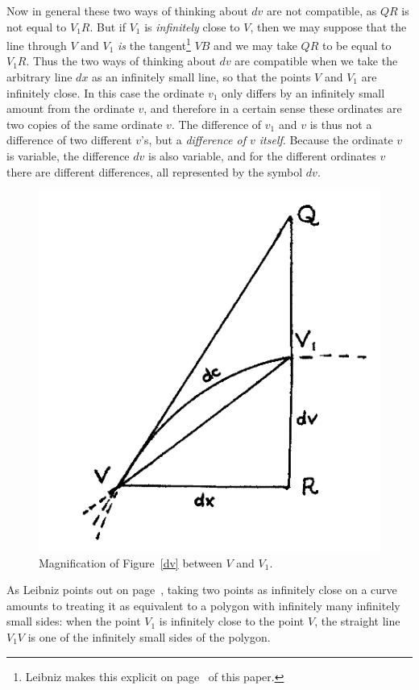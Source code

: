 \documentclass[twoside,openright]{article}
\begin{document}
Now in general these two ways of thinking about $dv$ are not
compatible, as $QR$ is not equal to $V_1R$.  But if $V_1$ is {\em
  infinitely} close to $V$, then we may suppose that the line through
$V$ and $V_1$ {\em is} the tangent\footnote{Leibniz makes this
  explicit on page~\pageref{taninfcl} of this paper.} $VB$ and we may
take $QR$ to be equal to $V_1R$.  Thus the two ways of thinking about
$dv$ are compatible when we take the arbitrary line $dx$ as an
infinitely small line, so that the points $V$ and $V_1$ are infinitely
close.  In this case the ordinate $v_1$ only differs by an infinitely
small amount from the ordinate $v$, and therefore in a certain sense
these ordinates are two copies of the same ordinate $v$.  The
difference of $v_1$ and $v$ is thus not a difference of two different
$v$'s, but a {\em difference of $v$ itself}.  Because the ordinate $v$
is variable, the difference $dv$ is also variable, and for the
different ordinates $v$ there are different differences, all
represented by the symbol $dv$.
\begin{figure}[h]
\begin{center}
\includegraphics[width=.5\textwidth]{fig/Figure3A}
\caption{Magnification of Figure~\ref{dv} between $V$ and $V_1$.}
\label{chartrifig}
\vspace{-10pt}
\end{center}
\end{figure}

As Leibniz points out on page~\pageref{taninfcl}, taking two points as
infinitely close on a curve amounts to treating it as equivalent to a
polygon with infinitely many infinitely small sides: when the point
$V_1$ is infinitely close to the point $V$, the straight line $V_1V$
is one of the infinitely small sides of the polygon.
\end{document}
